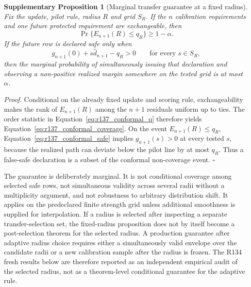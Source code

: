 \documentclass[11pt,letterpaper]{article}
\theoremstyle{plain}
\newtheorem{proposition}{Supplementary Proposition}
\newcommand{\1}{\mathbf 1}
\begin{document}
\begin{proposition}[Marginal transfer guarantee at a fixed radius]
Fix the update, pilot rule, radius $R$ and grid $S_R$. If the $n$ calibration requirements and one future protected requirement are exchangeable, then
\begin{equation}
 \Pr\{E_{n+1}(R)\le q_R\}\ge1-\alpha.
\label{eq:r137_conformal_coverage}
\end{equation}
If the future row is declared safe only when
\begin{equation}
 g_{n+1}(0)+s\widehat d_{n+1}-q_R>0\qquad\text{for every }s\in S_R,
\label{eq:r137_conformal_safe}
\end{equation}
then the marginal probability of simultaneously issuing that declaration and observing a non-positive realized margin somewhere on the tested grid is at most $\alpha$.
\end{proposition}
\textit{Proof.} Conditional on the already fixed update and scoring rule, exchangeability makes the rank of $E_{n+1}(R)$ among the $n+1$ residuals uniform up to ties. The order statistic in Equation~\ref{eq:r137_conformal_q} therefore yields Equation~\ref{eq:r137_conformal_coverage}. On the event $E_{n+1}(R)\le q_R$, Equation~\ref{eq:r137_conformal_safe} implies $g_{n+1}(s)>0$ at every tested $s$, because the realized path can deviate below the pilot line by at most $q_R$. Thus a false-safe declaration is a subset of the conformal non-coverage event. $\square$

The guarantee is deliberately marginal. It is not conditional coverage among selected safe rows, not simultaneous validity across several radii without a multiplicity argument, and not robustness to arbitrary distribution shift. It applies on the predeclared finite strength grid unless additional smoothness is supplied for interpolation. If a radius is selected after inspecting a separate transfer-selection set, the fixed-radius proposition does not by itself become a post-selection theorem for the selected radius. A production guarantee after adaptive radius choice requires either a simultaneously valid envelope over the candidate radii or a new calibration sample after the radius is frozen. The R134 fresh results below are therefore reported as an independent empirical audit of the selected radius, not as a theorem-level conditional guarantee for the adaptive rule.

\clearpage
\end{document}
